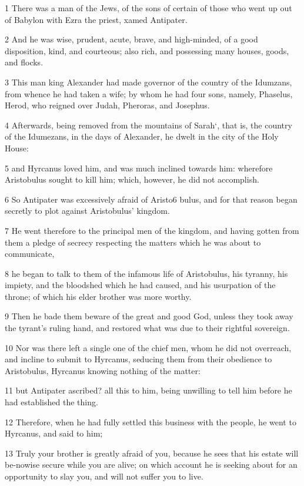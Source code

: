 1 There was a man of the Jews, of the sons of certain of those who went up out of Babylon with Ezra the priest, xamed Antipater. 

2 And he was wise, prudent, acute, brave, and high-minded, of a good disposition, kind, and courteous; also rich, and possessing many houses, goods, and flocks. 

3 This man king Alexander had made governor of the country of the Idumzans, from whence he had taken a wife; by whom he had four sons, namely, Phaselus, Herod, who reigned over Judah, Pheroras, and Josephus. 

4 Afterwards, being removed from the mountains of Sarah‘, that is, the country of the Idumezans, in the days of Alexander, he dwelt in the city of the Holy House: 

5 and Hyrcanus loved him, and was much inclined towards him: wherefore Aristobulus sought to kill him; which, however, he did not accomplish. 

6 So Antipater was excessively afraid of Aristo6 bulus, and for that reason began secretly to plot against Aristobulus’ kingdom. 

7 He went therefore to the principal men of the kingdom, and having gotten from them a pledge of secrecy respecting the matters which he was about to communicate, 

8 he began to talk to them of the infamous life of Aristobulus, his tyranny, his impiety, and the bloodshed which he had caused, and his usurpation of the throne; of which his elder brother was more worthy. 

9 Then he bade them beware of the great and good God, unless they took away the tyrant’s ruling hand, and restored what was due to their rightful sovereign. 

10 Nor was there left a single one of the chief men, whom he did not overreach, and incline to submit to Hyrcanus, seducing them from their obedience to Aristobulus, Hyrcanus knowing nothing of the matter: 

11 but Antipater ascribed? all this to him, being unwilling to tell him before he had established the thing. 

12 Therefore, when he had fully settled this business with the people, he went to Hyrcanus, and said to him; 

13 Truly your brother is greatly afraid of you, because he sees that his estate will be-nowise secure while you are alive; on which account he is seeking about for an opportunity to slay you, and will not suffer you to live. 

